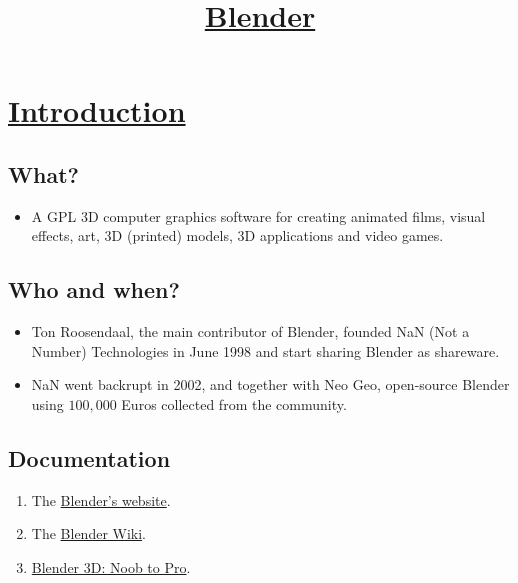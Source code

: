 
\title{\href{http://www.blender.org}{Blender}}

\maketitle
\tableofcontents

\chapter{\href{http://en.wikipedia.org/wiki/Blender_(software)}{Introduction}}

\section{What?}
\begin{itemize}
\item A GPL 3D computer graphics software for creating animated films,
  visual effects, art, 3D (printed) models, 3D applications and video
  games.
\end{itemize}

\section{Who and when?}
\begin{itemize}
\item Ton Roosendaal, the main contributor of Blender, founded NaN
  (Not a Number) Technologies in June 1998 and start sharing Blender
  as shareware.
\item NaN went backrupt in 2002, and together with Neo Geo,
open-source Blender using 
$100,000$ Euros collected from the
community.
\end{itemize}

\section{Documentation}
\begin{enumerate}
\item The \href{http://www.blender.org}{Blender's website}.
\item The \href{http://wiki.blender.org}{Blender Wiki}.
\item \href{http://en.wikibooks.org/wiki/Blender_3D:_Noob_to_Pro}{Blender 3D: Noob to Pro}.
\end{enumerate}

